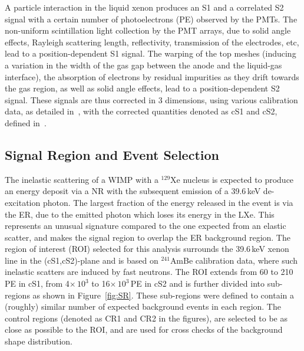A particle interaction in the liquid xenon produces an S1 and a correlated S2 signal with a certain number of photoelectrons (PE) observed by the PMTs. The non-uniform scintillation light collection by the PMT arrays, due to solid angle effects, Rayleigh scattering length, reflectivity, transmission of the electrodes, etc, lead to a position-dependent S1 signal. The warping of the top meshes (inducing a variation in the width of the gas gap between the anode and the liquid-gas interface), the absorption of electrons by residual impurities as they drift towards the gas region, as well as solid angle effects, lead to a position-dependent S2 signal. These signals are thus corrected in 3 dimensions, using various calibration data, as detailed in~\cite{Aprile:2011dd,Aprile:2012vw}, with the corrected quantities denoted as cS1 and cS2, defined in~\cite{Aprile:2012vw}. 

\subsection{Signal Region and Event Selection} 

The inelastic scattering of a WIMP with a $^{129}$Xe nucleus is expected to produce an energy deposit via a NR with the subsequent emission of  
a 39.6\,keV de-excitation photon. The largest fraction of the energy released in the event is via the ER, due to the emitted photon which loses its energy in the LXe.
This represents an unusual signature compared to the one expected from an elastic scatter, and makes the signal region to overlap the ER background region.
The region of interest (ROI) selected for this analysis surrounds the 39.6\,keV xenon line in the (cS1,cS2)-plane 
and is based on $^{241}$AmBe calibration data, where such inelastic scatters are induced by fast neutrons. The ROI extends from 60 to 210\,PE in cS1, from 4$\times \, 10^3$ to 16$\times \, 10^3$\,PE in cS2 and is further divided  into sub-regions as shown in Figure~\ref{fig:SR}.  These sub-regions were defined to  contain a (roughly) similar number of expected background events in each region. The control regions (denoted as CR1 and CR2 in the figures), are selected to be as close as possible to the ROI,  and are used for cross checks of the background shape distribution.

